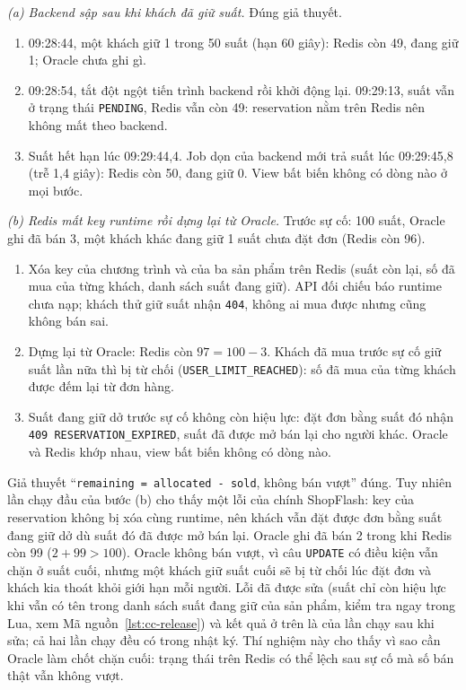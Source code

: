 \textit{(a) Backend sập sau khi khách đã giữ suất.} Đúng giả thuyết.
\begin{enumerate}
  \item 09:28:44, một khách giữ 1 trong 50 suất (hạn 60 giây): Redis còn 49, đang giữ 1; Oracle chưa ghi gì.
  \item 09:28:54, tắt đột ngột tiến trình backend rồi khởi động lại. 09:29:13, suất vẫn ở trạng thái \texttt{PENDING}, Redis vẫn còn 49: reservation nằm trên Redis nên không mất theo backend.
  \item Suất hết hạn lúc 09:29:44,4. Job dọn của backend mới trả suất lúc 09:29:45,8 (trễ 1,4 giây): Redis còn 50, đang giữ 0. View bất biến không có dòng nào ở mọi bước.
\end{enumerate}

\textit{(b) Redis mất key runtime rồi dựng lại từ Oracle.} Trước sự cố: 100 suất, Oracle ghi đã bán 3, một khách khác đang giữ 1 suất chưa đặt đơn (Redis còn 96).
\begin{enumerate}
  \item Xóa key của chương trình và của ba sản phẩm trên Redis (suất còn lại, số đã mua của từng khách, danh sách suất đang giữ). API đối chiếu báo runtime chưa nạp; khách thử giữ suất nhận \texttt{404}, không ai mua được nhưng cũng không bán sai.
  \item Dựng lại từ Oracle: Redis còn $97 = 100 - 3$. Khách đã mua trước sự cố giữ suất lần nữa thì bị từ chối (\texttt{USER\_LIMIT\_REACHED}): số đã mua của từng khách được đếm lại từ đơn hàng.
  \item Suất đang giữ dở trước sự cố không còn hiệu lực: đặt đơn bằng suất đó nhận \texttt{409 RESERVATION\_EXPIRED}, suất đã được mở bán lại cho người khác. Oracle và Redis khớp nhau, view bất biến không có dòng nào.
\end{enumerate}
Giả thuyết ``\texttt{remaining = allocated - sold}, không bán vượt'' đúng. Tuy nhiên lần chạy đầu của bước (b) cho thấy một lỗi của chính ShopFlash: key của reservation không bị xóa cùng runtime, nên khách vẫn đặt được đơn bằng suất đang giữ dở dù suất đó đã được mở bán lại. Oracle ghi đã bán 2 trong khi Redis còn 99 ($2 + 99 > 100$). Oracle không bán vượt, vì câu \texttt{UPDATE} có điều kiện vẫn chặn ở suất cuối, nhưng một khách giữ suất cuối sẽ bị từ chối lúc đặt đơn và khách kia thoát khỏi giới hạn mỗi người. Lỗi đã được sửa (suất chỉ còn hiệu lực khi vẫn có tên trong danh sách suất đang giữ của sản phẩm, kiểm tra ngay trong Lua, xem Mã nguồn~\ref{lst:cc-release}) và kết quả ở trên là của lần chạy sau khi sửa; cả hai lần chạy đều có trong nhật ký. Thí nghiệm này cho thấy vì sao cần Oracle làm chốt chặn cuối: trạng thái trên Redis có thể lệch sau sự cố mà số bán thật vẫn không vượt.

